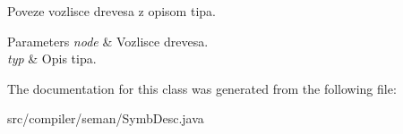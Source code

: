 Poveze vozlisce drevesa z opisom tipa.


\begin{DoxyParams}{Parameters}
{\em node} & Vozlisce drevesa. \\
\hline
{\em typ} & Opis tipa. \\
\hline
\end{DoxyParams}


The documentation for this class was generated from the following file\+:\begin{DoxyCompactItemize}
\item 
src/compiler/seman/Symb\+Desc.\+java\end{DoxyCompactItemize}
